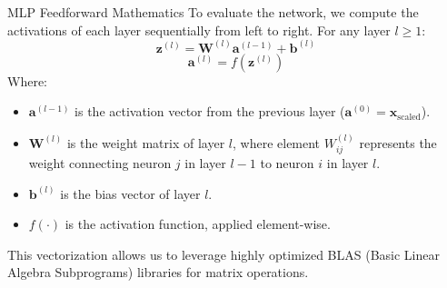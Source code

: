 \documentclass[9pt]{beamer}
\begin{document}
\begin{frame}{MLP Feedforward Mathematics}
  To evaluate the network, we compute the activations of each layer sequentially from left to right. For any layer $l \ge 1$:
  $$\mathbf{z}^{(l)} = \mathbf{W}^{(l)} \mathbf{a}^{(l-1)} + \mathbf{b}^{(l)}$$
  $$\mathbf{a}^{(l)} = f(\mathbf{z}^{(l)})$$
  Where:
  \begin{itemize}
    \item $\mathbf{a}^{(l-1)}$ is the activation vector from the previous layer ($\mathbf{a}^{(0)} = \mathbf{x}_{\text{scaled}}$).
    \item $\mathbf{W}^{(l)}$ is the weight matrix of layer $l$, where element $W_{ij}^{(l)}$ represents the weight connecting neuron $j$ in layer $l-1$ to neuron $i$ in layer $l$.
    \item $\mathbf{b}^{(l)}$ is the bias vector of layer $l$.
    \item $f(\cdot)$ is the activation function, applied element-wise.
  \end{itemize}
  This vectorization allows us to leverage highly optimized BLAS (Basic Linear Algebra Subprograms) libraries for matrix operations.
\end{frame}
\end{document}
